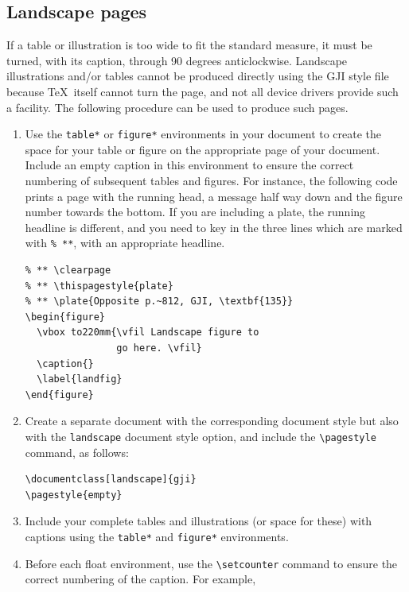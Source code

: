 \documentclass{gji}
\begin{document}
\subsection{Landscape pages}

If a table or illustration is too wide to fit the standard measure, it
must be turned, with its caption, through 90 degrees anticlockwise.
Landscape illustrations and/or tables cannot be produced directly
using the GJI style file because \TeX\ itself cannot turn the
page, and not all device drivers provide such a facility.
The following procedure can be used to produce such pages.
\begin{enumerate}
  \item Use the \verb"table*" or \verb"figure*" environments in your
        document to create the space for your table or figure on the
        appropriate page of your document. Include an empty
        caption in this environment to ensure the correct
        numbering of subsequent tables and figures. For instance, the
        following code prints a page with the running head, a message
        half way down and the figure number towards the bottom. If you
        are including a plate, the running headline is different, and you
        need to key in the three lines which are marked with \verb"% **",
        with an appropriate headline.
\begin{verbatim}
% ** \clearpage
% ** \thispagestyle{plate}
% ** \plate{Opposite p.~812, GJI, \textbf{135}}
\begin{figure}
  \vbox to220mm{\vfil Landscape figure to
                go here. \vfil}
  \caption{}
  \label{landfig}
\end{figure}
\end{verbatim}
\item Create a separate document with the corresponding document style
      but also with the \verb"landscape" document style option, and
      include the \verb"\pagestyle" command, as follows:
\begin{verbatim}
\documentclass[landscape]{gji}
\pagestyle{empty}
\end{verbatim}
  \item Include your complete tables and illustrations (or space for
        these) with captions using the \verb"table*" and \verb"figure*"
        environments.
  \item Before each float environment, use the
        \verb"\setcounter" command to ensure the correct numbering of
        the caption. For example,
\begin{verbatim}

\end{verbatim}
\end{enumerate}
\end{document}

